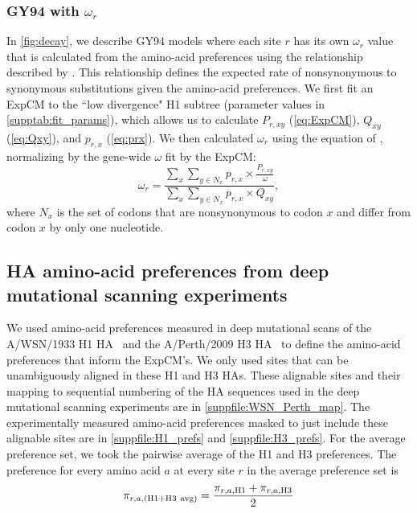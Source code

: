 \documentclass[11pt]{article}
\begin{document}
\subsubsection*{GY94 with $\omega_r$}
In \ref{fig:decay}, we describe GY94 models where each site $r$ has its own $\omega_r$ value that is calculated from the amino-acid preferences using the relationship described by \citet{spielman2015relationship}.
This relationship defines the expected rate of nonsynonymous to synonymous substitutions given the amino-acid preferences.
We first fit an ExpCM to the ``low divergence" H1 subtree (parameter values in \ref{supptab:fit_params}), which allows us to calculate $P_{r,xy}$ (\ref{eq:ExpCM}), $Q_{xy}$ (\ref{eq:Qxy}), and $p_{r,x}$ (\ref{eq:prx}).
We then calculated $\omega_r$ using the equation of \citet{spielman2015relationship}, normalizing by the gene-wide $\omega$ fit by the ExpCM:
\begin{equation}
\label{eq:w_r}
\omega_{r} = \frac{\sum_{x} \sum_{y \in N_x} {p_{r,x} \times \frac{P_{r,xy}}{\omega}}}{\sum_{x} \sum_{y \in N_x} {p_{r,x} \times Q_{xy}}},
\end{equation}
where $N_x$ is the set of codons that are nonsynonymous to codon $x$ and differ from codon $x$ by only one nucleotide. 

\subsection*{HA amino-acid preferences from deep mutational scanning experiments}
We used amino-acid preferences measured in deep mutational scans of the A/WSN/1933 H1 HA~\citep{doud2016accurate} and the A/Perth/2009 H3 HA~\citep{lee2018deep} to define the amino-acid preferences that inform the ExpCM's. 
We only used sites that can be unambiguously aligned in these H1 and H3 HAs. 
These alignable sites and their mapping to sequential numbering of the HA sequences used in the deep mutational scanning experiments are in \ref{suppfile:WSN_Perth_map}. 
The experimentally measured amino-acid preferences masked to just include these alignable sites are in \ref{suppfile:H1_prefs} and \ref{suppfile:H3_prefs}.
For the average preference set, we took the pairwise average of the H1 and H3 preferences. 
The preference for every amino acid $a$ at every site $r$ in the average preference set is
\begin{equation}
\label{eq:pi_avg}
\pi_{r,a,\rm{(H1+H3\ avg)}} = \frac{\pi_{r,a,\rm{H1}} + \pi_{r,a,\rm{H3}}}{2}
\end{equation}
\end{document}

